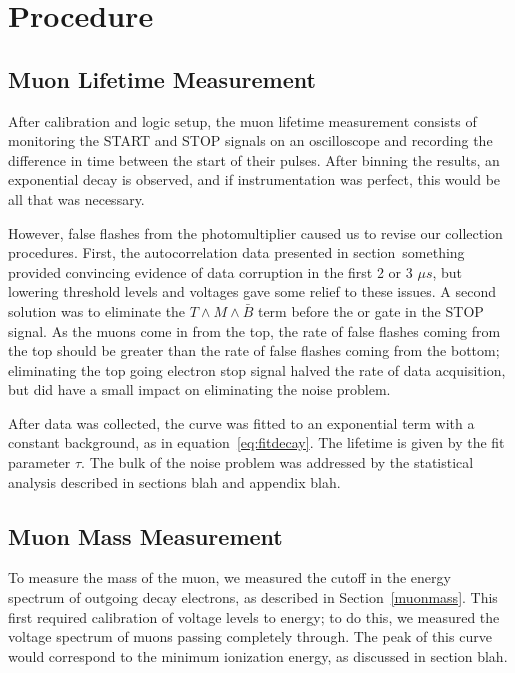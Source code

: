 \section{Procedure}\label{procedure}

\subsection{Muon Lifetime Measurement}
\label{muonlifetimemeasurement}

After calibration and logic setup, the muon lifetime measurement consists of monitoring the START and STOP signals on an oscilloscope and recording the difference in time between the start of their pulses. After binning the results, an exponential decay is observed, and if instrumentation was perfect, this would be all that was necessary.

However, false flashes from the photomultiplier caused us to revise our collection procedures. First, the autocorrelation data presented in section~something provided convincing evidence of data corruption in the first 2 or 3 $\mu s$, but lowering threshold levels and voltages gave some relief to these issues. A second solution was to eliminate the $T \wedge M \wedge \bar{B}$ term before the or gate in the STOP signal. As the muons come in from the top, the rate of false flashes coming from the top should be greater than the rate of false flashes coming from the bottom; eliminating the top going electron stop signal halved the rate of data acquisition, but did have a small impact on eliminating the noise problem. 

After data was collected, the curve was fitted to an exponential term with a constant background, as in equation~\eqref{eq:fitdecay}. The lifetime is given by the fit parameter $\tau$. The bulk of the noise problem was addressed by the statistical analysis described in sections blah and appendix blah.

\subsection{Muon Mass Measurement}
\label{muonmassmeasurement}

To measure the mass of the muon, we measured the cutoff in the energy spectrum of outgoing decay electrons, as described in Section~\ref{muonmass}. This first required calibration of voltage levels to energy; to do this, we measured the voltage spectrum of muons passing completely through. The peak of this curve would correspond to the minimum ionization energy, as discussed in section blah. 

